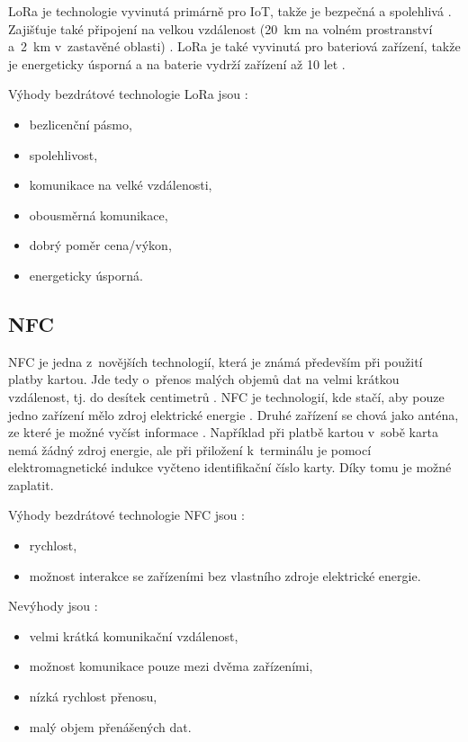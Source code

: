 LoRa je technologie vyvinutá primárně pro IoT, takže je bezpečná a spolehlivá \cite{LoRa_IoT_PORT}. Zajišťuje také připojení na velkou vzdálenost (20~km na 
volném prostranství a~2~km v~zastavěné oblasti) \cite{LoRa_IoT_PORT}. LoRa je také vyvinutá pro bateriová zařízení, takže je energeticky úsporná a na baterie
 vydrží zařízení až 10 let \cite{LoRa_IoT_PORT}.

Výhody bezdrátové technologie LoRa jsou \cite{LoRa_IoT_PORT}:
\begin{itemize}
  \item bezlicenční pásmo,
  \item spolehlivost,
  \item komunikace na velké vzdálenosti,
  \item obousměrná komunikace,
  \item dobrý poměr cena/výkon,
  \item energeticky úsporná.
\end{itemize}

\subsection{NFC}
NFC je jedna z~novějších technologií, která je známá především při použití platby kartou. Jde tedy o~přenos malých objemů dat na velmi krátkou 
vzdálenost, tj. do desítek centimetrů \cite{Bezdrat_muni}. NFC je technologií, kde stačí, aby pouze jedno zařízení mělo zdroj elektrické 
energie \cite{Bezdrat_muni}. Druhé zařízení se chová jako anténa, ze které je možné vyčíst informace \cite{Bezdrat_muni}. Například při 
platbě kartou v~sobě karta nemá žádný zdroj energie, ale při přiložení k~terminálu je pomocí elektromagnetické indukce vyčteno identifikační
číslo karty. Díky tomu je možné zaplatit. 

Výhody bezdrátové technologie NFC jsou \cite{Bezdrat_muni}:
\begin{itemize}
  \item rychlost,
  \item možnost interakce se zařízeními bez vlastního zdroje elektrické energie.
\end{itemize}

Nevýhody jsou \cite{Bezdrat_muni}:
\begin{itemize}
  \item velmi krátká komunikační vzdálenost,
  \item možnost komunikace pouze mezi dvěma zařízeními, 
  \item nízká rychlost přenosu,
  \item malý objem přenášených dat.
\end{itemize}

